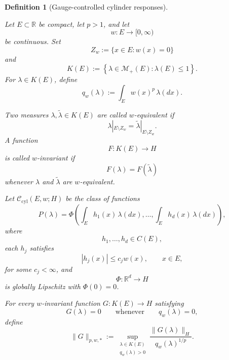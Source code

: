 \documentclass[a4paper,10pt]{article}
\newtheorem{defin}[thm]{Definition}
\begin{document}
\begin{defin}[Gauge-controlled cylinder responses]
\label{defin:gauge-controlled-cylinder-responses}

Let \(E\subset\mathbb R\) be compact, let \(p>1\), and let
\[
        w:E\longrightarrow[0,\infty)
\]
be continuous. Set
\[
        Z_w:=\{x\in E:w(x)=0\}
\]
and
\[
        K(E)
        :=
        \left\{
        \lambda\in\mathcal M_+(E):
        \lambda(E)\le1
        \right\}.
\]
For \(\lambda\in K(E)\), define
\[
        q_w(\lambda)
        :=
        \int_E w(x)^p\,\lambda(dx).
\]

Two measures \(\lambda,\widetilde\lambda\in K(E)\) are called
\(w\)-equivalent if
\[
        \lambda|_{E\setminus Z_w}
        =
        \widetilde\lambda|_{E\setminus Z_w}.
\]
A function
\[
        F:K(E)\longrightarrow H
\]
is called \(w\)-invariant if
\[
        F(\lambda)=F(\widetilde\lambda)
\]
whenever \(\lambda\) and \(\widetilde\lambda\) are \(w\)-equivalent.

Let \(\mathcal C_{\mathrm{cyl}}(E,w;H)\) be the class of functions
\[
P(\lambda)
=
\Phi
\left(
        \int_E h_1(x)\,\lambda(dx),
        \ldots,
        \int_E h_d(x)\,\lambda(dx)
\right),
\]
where
\[
        h_1,\ldots,h_d\in C(E),
\]
each \(h_j\) satisfies
\[
        |h_j(x)|\le c_jw(x),
        \qquad x\in E,
\]
for some \(c_j<\infty\), and
\[
        \Phi:\mathbb R^d\longrightarrow H
\]
is globally Lipschitz with \(\Phi(0)=0\).

For every \(w\)-invariant function \(G:K(E)\to H\) satisfying
\[
        G(\lambda)=0
        \qquad\text{whenever}\qquad
        q_w(\lambda)=0,
\]
define
\[
        \lVert G\rVert_{p,w,*}
        :=
        \sup_{\substack{\lambda\in K(E)\\q_w(\lambda)>0}}
        \frac{\lVert G(\lambda)\rVert_H}
             {q_w(\lambda)^{1/p}}.
\]
\end{defin}
\end{document}
